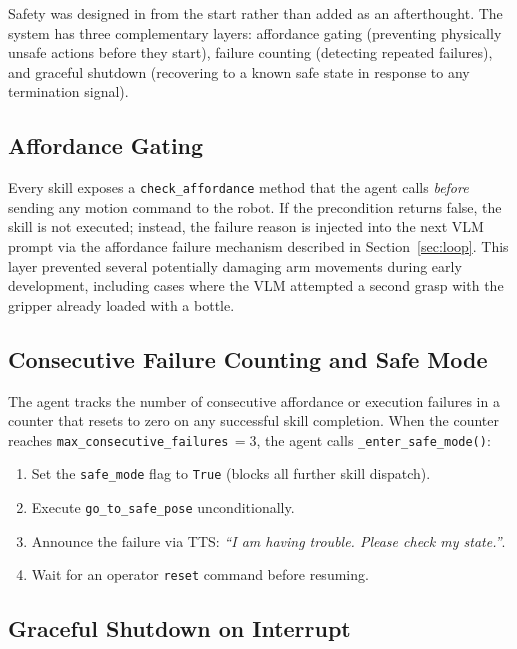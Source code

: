 Safety was designed in from the start rather than added as an afterthought.
The system has three complementary layers: affordance gating (preventing
physically unsafe actions before they start), failure counting (detecting
repeated failures), and graceful shutdown (recovering to a known safe state
in response to any termination signal).

\subsection{Affordance Gating}

Every skill exposes a \texttt{check\_affordance} method that the agent calls
\emph{before} sending any motion command to the robot.
If the precondition returns false, the skill is not executed; instead, the
failure reason is injected into the next VLM prompt via the affordance failure
mechanism described in Section~\ref{sec:loop}.
This layer prevented several potentially damaging arm movements during early
development, including cases where the VLM attempted a second grasp with the
gripper already loaded with a bottle.

\subsection{Consecutive Failure Counting and Safe Mode}

\begin{sloppypar}
The agent tracks the number of consecutive affordance or execution failures
in a counter that resets to zero on any successful skill completion.
When the counter reaches \texttt{max\_consecutive\_failures}$\,=3$, the agent
calls \texttt{\_enter\_safe\_mode()}:
\end{sloppypar}

\begin{enumerate}[noitemsep]
  \item Set the \texttt{safe\_mode} flag to \texttt{True} (blocks all further
        skill dispatch).
  \item Execute \texttt{go\_to\_safe\_pose} unconditionally.
  \item Announce the failure via TTS: \emph{``I am having trouble. Please check
        my state.''}.
  \item Wait for an operator \texttt{reset} command before resuming.
\end{enumerate}

\subsection{Graceful Shutdown on Interrupt}

